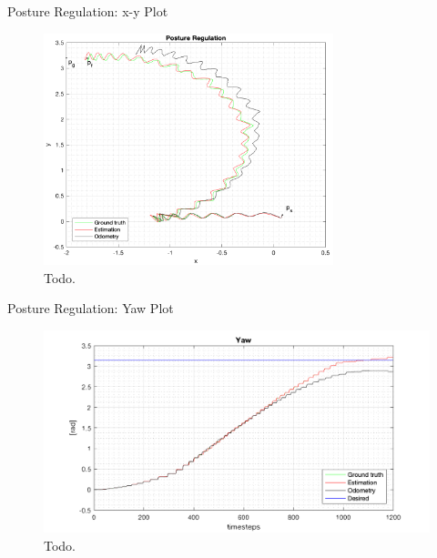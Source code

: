 \documentclass[10pt]{beamer}
\begin{document}
    \begin{frame}{Posture Regulation: x-y Plot}
        \begin{figure}
            \caption{Todo.}
            \includegraphics[width=0.75\textwidth]{images/posture_regulation.png}
        \end{figure}
    \end{frame}

    \begin{frame}{Posture Regulation: Yaw Plot}
        \begin{figure}
            \caption{Todo.}
            \includegraphics[width=\textwidth]{images/yaw_postureregulation.png}
        \end{figure}
    \end{frame}
\end{document}
